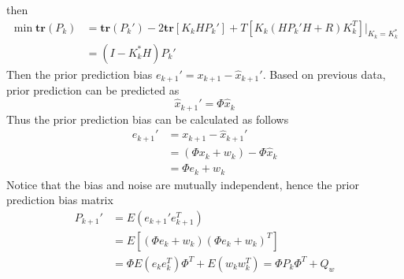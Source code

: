 \documentclass[12pt]{article}
\newcommand{\tr}{\bm{tr}}
\begin{document}
    then
    \begin{equation}
    \begin{aligned}
        \min \tr(P_k) &= \tr (P_k') - 2\tr [K_kHP_k'] + T\left[K_k(HP_k'H+R)K_k^T\right] \bigg|_{K_k = K_k^{*}} \\
        &= (I - K_k^{*}H)P_k'
    \end{aligned}
    \end{equation}
    Then the prior prediction bias $e_{k+1}' = x_{k+1} - \hat x_{k+1}'$. Based on previous data, prior prediction can be predicted as
    \begin{equation}
        \hat x_{k+1}' = \Phi \hat x_{k}
    \end{equation}
    Thus the prior prediction bias can be calculated as follows
    \begin{equation}
    \begin{aligned}
        e_{k+1}' &= x_{k+1} - \hat x_{k+1}' \\
        &= (\Phi x_{k} + w_k) - \Phi \hat x_{k} \\
        &= \Phi e_k + w_k
    \end{aligned}
    \end{equation}
    Notice that the bias and noise are mutually independent, hence the prior prediction bias matrix
    \begin{equation}
    \begin{aligned}
        P_{k+1}' &= E(e_{k+1}'e_{k+1}^T) \\
        &= E \left[(\Phi e_k + w_k)(\Phi e_k + w_k)^T \right] \\
        &= \Phi E(e_ke_k^T) \Phi^T + E(w_kw_k^T) = \Phi P_k \Phi^T + Q_w
    \end{aligned}
    \end{equation}
\end{document}
